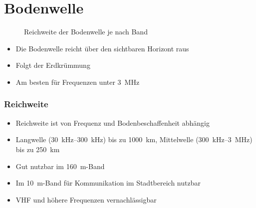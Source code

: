 
\section{Bodenwelle}
\label{section:bodenwelle}
\begin{frame}%
    \begin{figure}
        \caption{\scriptsize Reichweite der Bodenwelle je nach Band}
        \label{e_reichweite_bodenwelle}
    \end{figure}
    \begin{itemize}
        \item Die Bodenwelle reicht über den sichtbaren Horizont raus
        \item Folgt der Erdkrümmung
        \item Am besten für Frequenzen unter \qty{3}{\mega\hertz}
    \end{itemize}
\end{frame}

\begin{frame}
\frametitle{Reichweite}
\begin{itemize}
  \item Reichweite ist von Frequenz und Bodenbeschaffenheit abhängig
  \item Langwelle (\qty{30}{\kilo\hertz}–\qty{300}{\kilo\hertz}) bis zu \qty{1000}{\kilo\metre}, Mittelwelle (\qty{300}{\kilo\hertz}–\qty{3}{\mega\hertz}) bis zu \qty{250}{\kilo\metre}
  \item Gut nutzbar im \qty{160}{\metre}-Band
  \item Im \qty{10}{\metre}-Band für Kommunikation im Stadtbereich nutzbar
  \item VHF und höhere Frequenzen vernachlässigbar
  \end{itemize}

\end{frame}

